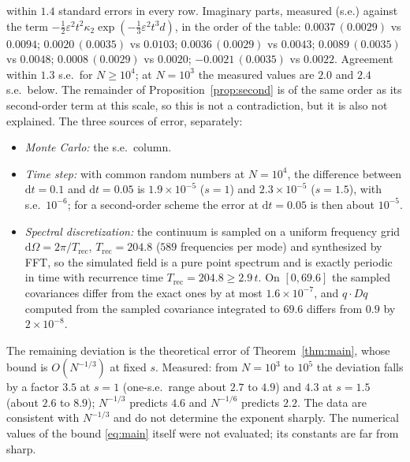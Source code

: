 \documentclass[11pt]{article}
\newcommand{\dd}{\mathrm{d}}
\newcommand{\eps}{\varepsilon}
\theoremstyle{remark}
\begin{document}
within $1.4$ standard errors in every row. Imaginary parts, measured
(s.e.) against the term $-\frac12\eps^2t^2\kappa_2\exp(-\frac13\eps^2t^3d)$,
in the order of the table: $0.0037\,(0.0029)$ vs $0.0094$;
$0.0020\,(0.0035)$ vs $0.0103$; $0.0036\,(0.0029)$ vs $0.0043$;
$0.0089\,(0.0035)$ vs $0.0048$; $0.0008\,(0.0029)$ vs $0.0020$;
$-0.0021\,(0.0035)$ vs $0.0022$. Agreement within $1.3$ s.e.\ for
$N\ge10^4$; at $N=10^3$ the measured values are $2.0$ and $2.4$ s.e.\ below.
The remainder of Proposition~\ref{prop:second} is of the same order as its
second-order term at this scale, so this is not a contradiction, but it is
also not explained. The three sources of error, separately:
\begin{itemize}
  \item \emph{Monte Carlo:} the s.e.\ column.
  \item \emph{Time step:} with common random numbers at $N=10^4$, the
    difference between $\dd t = 0.1$ and $\dd t = 0.05$ is
    $1.9\times10^{-5}$ ($s=1$) and $2.3\times10^{-5}$ ($s=1.5$), with s.e.\
    $10^{-6}$; for a second-order scheme the error at $\dd t=0.05$ is then
    about $10^{-5}$.
  \item \emph{Spectral discretization:} the continuum is sampled on a
    uniform frequency grid $\dd\Omega = 2\pi/T_{\mathrm{rec}}$,
    $T_{\mathrm{rec}} = 204.8$ ($589$ frequencies per mode) and synthesized
    by FFT, so the simulated field is a pure point spectrum and is exactly
    periodic in time with recurrence time $T_{\mathrm{rec}} = 204.8\ge2.9\,t$.
    On $[0,69.6]$ the sampled covariances differ from the exact ones by at
    most $1.6\times10^{-7}$, and $q\cdot Dq$ computed from the sampled
    covariance integrated to $69.6$ differs from $0.9$ by $2\times10^{-8}$.
\end{itemize}
The remaining deviation is the theoretical error of
Theorem~\ref{thm:main}, whose bound is $O(N^{-1/3})$ at fixed $s$. Measured:
from $N=10^3$ to $10^5$ the deviation falls by a factor $3.5$ at $s=1$
(one-s.e.\ range about $2.7$ to $4.9$) and $4.3$ at $s=1.5$ (about $2.6$ to
$8.9$); $N^{-1/3}$ predicts $4.6$ and $N^{-1/6}$ predicts $2.2$. The data
are consistent with $N^{-1/3}$ and do not determine the exponent sharply.
The numerical values of the bound \eqref{eq:main} itself were not
evaluated; its constants are far from sharp.
\end{document}
